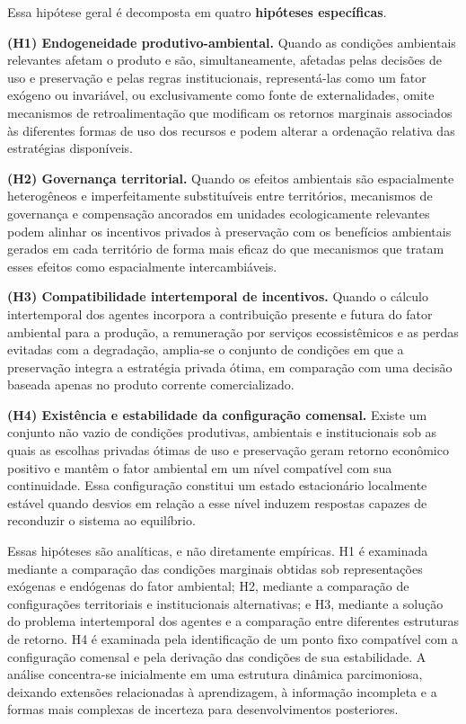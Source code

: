 
Essa hipótese geral é decomposta em quatro \textbf{hipóteses específicas}.

\textbf{(H1) Endogeneidade produtivo-ambiental.} Quando as condições ambientais relevantes afetam o produto e são, simultaneamente, afetadas pelas decisões de uso e preservação e pelas regras institucionais, representá-las como um fator exógeno ou invariável, ou exclusivamente como fonte de externalidades, omite mecanismos de retroalimentação que modificam os retornos marginais associados às diferentes formas de uso dos recursos e podem alterar a ordenação relativa das estratégias disponíveis. %

\textbf{(H2) Governança territorial.} Quando os efeitos ambientais são espacialmente heterogêneos e imperfeitamente substituíveis entre territórios, mecanismos de governança e compensação ancorados em unidades ecologicamente relevantes podem alinhar os incentivos privados à preservação com os benefícios ambientais gerados em cada território de forma mais eficaz do que mecanismos que tratam esses efeitos como espacialmente intercambiáveis. %

\textbf{(H3) Compatibilidade intertemporal de incentivos.} Quando o cálculo intertemporal dos agentes incorpora a contribuição presente e futura do fator ambiental para a produção, a remuneração por serviços ecossistêmicos e as perdas evitadas com a degradação, amplia-se o conjunto de condições em que a preservação integra a estratégia privada ótima, em comparação com uma decisão baseada apenas no produto corrente comercializado. %

\textbf{(H4) Existência e estabilidade da configuração comensal.} Existe um conjunto não vazio de condições produtivas, ambientais e institucionais sob as quais as escolhas privadas ótimas de uso e preservação geram retorno econômico positivo e mantêm o fator ambiental em um nível compatível com sua continuidade. Essa configuração constitui um estado estacionário localmente estável quando desvios em relação a esse nível induzem respostas capazes de reconduzir o sistema ao equilíbrio. %

Essas hipóteses são analíticas, e não diretamente empíricas. H1 é examinada mediante a comparação das condições marginais obtidas sob representações exógenas e endógenas do fator ambiental; H2, mediante a comparação de configurações territoriais e institucionais alternativas; e H3, mediante a solução do problema intertemporal dos agentes e a comparação entre diferentes estruturas de retorno. H4 é examinada pela identificação de um ponto fixo compatível com a configuração comensal e pela derivação das condições de sua estabilidade. A análise concentra-se inicialmente em uma estrutura dinâmica parcimoniosa, deixando extensões relacionadas à aprendizagem, à informação incompleta e a formas mais complexas de incerteza para desenvolvimentos posteriores.


